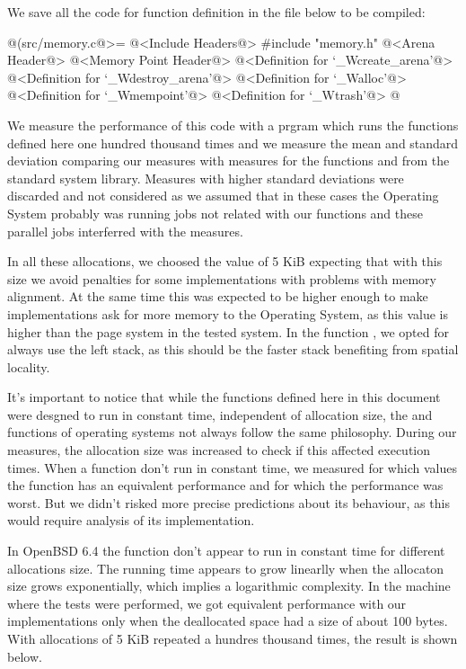 
We save all the code for function definition in the file below to be
compiled:

\iniciocodigo
@(src/memory.c@>=
@<Include Headers@>
#include "memory.h"
@<Arena Header@>
@<Memory Point Header@>
@<Definition for `\_Wcreate\_arena'@>
@<Definition for `\_Wdestroy\_arena'@>
@<Definition for `\_Walloc'@>
@<Definition for `\_Wmempoint'@>
@<Definition for `\_Wtrash'@>
@
\fimcodigo


We measure the performance of this code with a prgram which runs the
functions defined here one hundred thousand times and we measure the
mean and standard deviation comparing our measures with measures for
the functions  and  from the
standard system library. Measures with higher standard deviations
were discarded and not considered as we assumed that in these cases
the Operating System probably was running jobs not related with our
functions and these parallel jobs interferred with the measures.

In all these allocations, we choosed the value of 5 KiB expecting that
with this size we avoid penalties for some 
implementations with problems with memory alignment. At the same time
this was expected to be higher enough to make 
implementations ask for more memory to the Operating System, as this
value is higher than the page system in the tested system. In the
function , we opted for always use the left stack,
as this should be the faster stack benefiting from spatial locality.

It's important to notice that while the functions defined here in this
document were desgned to run in constant time, independent of
allocation size, the  and 
functions of operating systems not always follow the same
philosophy. During our measures, the allocation size was increased to
check if this affected execution times. When a function don't run in
constant time, we measured for which values the function has an
equivalent performance and for which the performance was worst. But we
didn't risked more precise predictions about its behaviour, as this
would require analysis of its implementation.



In OpenBSD 6.4 the function  don't appear to run in
constant time for different allocations size. The running time appears
to grow linearlly when the allocaton size grows exponentially, which
implies a logarithmic complexity. In the machine where the tests were
performed, we got equivalent performance with our implementations only
when the deallocated space had a size of about 100 bytes. With
allocations of 5 KiB repeated a hundres thousand times, the result is
shown below.

